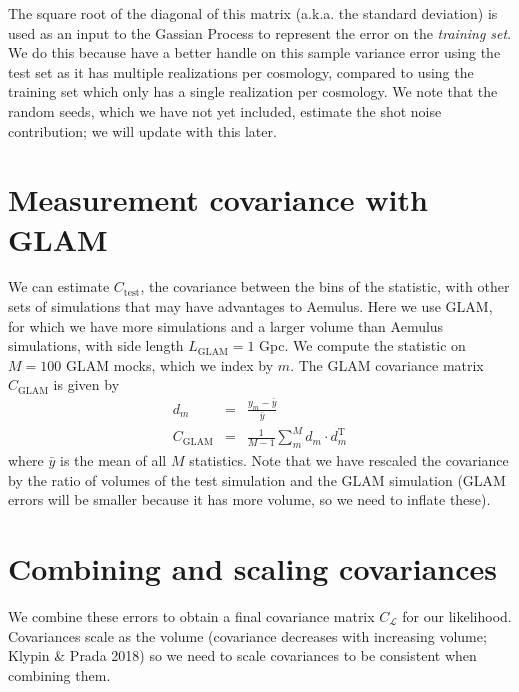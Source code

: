 \documentclass[12pt]{article}
\newcommand{\T}{^{\mathrm{T}}}
\newcommand{\like}{\mathcal{L}}
\newcommand{\cov}[1]{C_\text{#1}}
\newcommand{\covtot}{C_\like}
\begin{document}
The square root of the diagonal of this matrix (a.k.a. the standard deviation) is used as an input to the Gassian Process to represent the error on the \emph{training set}. %
We do this because have a better handle on this sample variance error using the test set as it has multiple realizations per cosmology, compared to using the training set which only has a single realization per cosmology.
We note that the random seeds, which we have not yet included, estimate the shot noise contribution; we will update with this later.


\section{Measurement covariance with GLAM}

We can estimate $\cov{test}$, the covariance between the bins of the statistic, with other sets of simulations that may have advantages to Aemulus.
Here we use GLAM, for which we have more simulations and a larger volume than Aemulus simulations, with side length $L_\text{GLAM}=1$ Gpc.
We compute the statistic on $M=100$ GLAM mocks, which we index by $m$.
The GLAM covariance matrix $\cov{GLAM}$ is given by
\begin{eqnarray}
d_m &=& \frac{y_{m} - \bar{y}}{\bar{y}} \\
\cov{GLAM} &=& \frac{1}{M-1} \sum_m^M d_m \cdot d_m\T
\end{eqnarray}
where $\bar{y}$ is the mean of all $M$ statistics.
Note that we have rescaled the covariance by the ratio of volumes of the test simulation and the GLAM simulation (GLAM errors will be smaller because it has more volume, so we need to inflate these).


\section{Combining and scaling covariances}

We combine these errors to obtain a final covariance matrix $\covtot$ for our likelihood.
Covariances scale as the volume (covariance decreases with increasing volume; Klypin \& Prada 2018) so we need to scale covariances to be consistent when combining them.
\end{document}
